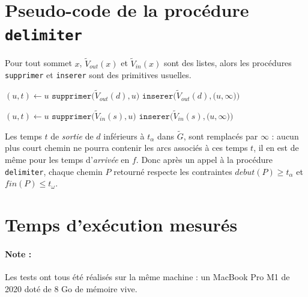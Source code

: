 \documentclass{article}
\begin{document}
\begin{appendices}
\section{Pseudo-code de la procédure \texttt{delimiter}}
Pour tout sommet $x$, $\tilde{V}_{out}(x)$ et $\tilde{V}_{in}(x)$ sont des
listes, alors les procédures \texttt{supprimer} et \texttt{inserer} sont des
primitives usuelles.

\label{p-c-delimiter}
\begin{algorithm}[h]
    \begin{algorithmic}[1]
        \State $(u, t) \leftarrow u$
            \State $\texttt{supprimer($\tilde{V}_{out}(d), u$)}$
            \State $\texttt{inserer($\tilde{V}_{out}(d), (u,\infty$))}$
        \EndIf
    \EndFor

    \State $(u, t) \leftarrow u$
        \State $\texttt{supprimer($\tilde{V}_{in}(s), u$)}$
        \State $\texttt{inserer($\tilde{V}_{in}(s), (u,\infty$))}$
    \EndIf
    \EndFor
    \EndProcedure
    \end{algorithmic}
\end{algorithm}

Les temps $t$ de \textit{sortie} de $d$ inférieurs à $t_\alpha$ dans
$\tilde{G}$, sont remplacés par $\infty$ : aucun plus court chemin ne pourra
contenir les arcs associés à ces temps $t$, il en est de même pour les temps
d'\textit{arrivée} en $f$. Donc après un appel à la procédure
\texttt{delimiter}, chaque chemin $P$ retourné respecte les contraintes
$debut(P) \geq t_\alpha$ et $fin(P) \leq t_\omega$.


\section{Temps d'exécution mesurés}
\paragraph{Note : } Les tests ont tous été réalisés sur la même machine : un
MacBook Pro M1 de 2020 doté de 8 Go de mémoire vive. \\
\label{val-mes}

\end{appendices}
\end{document}
